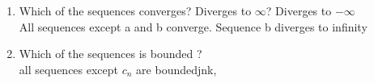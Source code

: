 \documentclass[11pt]{article}
\theoremstyle{definition}  %
\begin{document}
\begin{enumerate}
\begin{enumerate}
    \item Which of the sequences converges? Diverges to $\infty$? Diverges to $-\infty$\\
    All sequences except a and b converge. Sequence b diverges to infinity
    \item Which of the sequences is bounded ?\\
    all sequences except $c_n$ are boundedjnk,
  \end{enumerate}
\end{enumerate}
\end{document}
